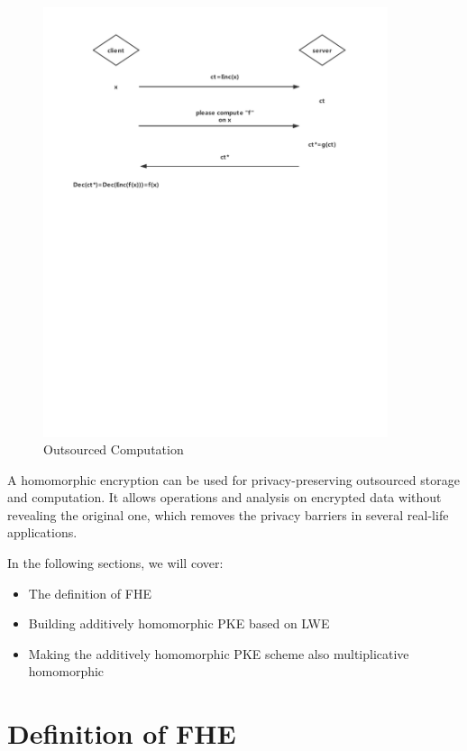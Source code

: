 \documentclass[usletter]{article}
\begin{document}
\begin{figure}[!htbp]
\begin{center}
\includegraphics[width=0.9\textwidth]{client-server.pdf}
\end{center}
\caption{Outsourced Computation}
\label{com}
\end{figure}

A homomorphic encryption  can be used for privacy-preserving outsourced storage and computation. It allows operations and analysis on encrypted data without revealing the original one, which removes the privacy barriers in several real-life applications.

In the following sections, we will cover:
\begin{itemize}
\item The definition of FHE
\item Building additively homomorphic PKE based on LWE
\item Making the additively homomorphic PKE scheme also multiplicative homomorphic
\end{itemize}

\section{Definition of FHE}
\end{document}
